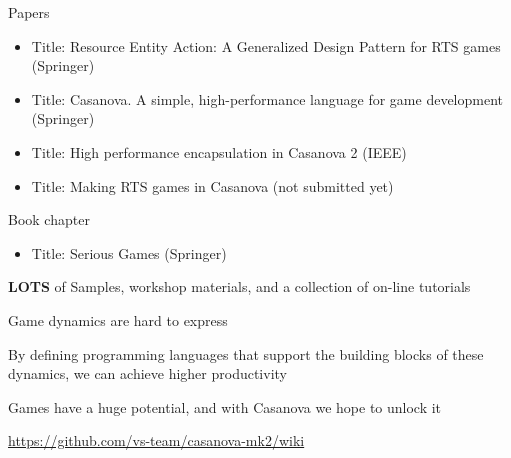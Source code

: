 \documentclass{beamer}
\begin{document}
\begin{slide}{
\item Papers
\begin{itemize}
\item Title: Resource Entity Action: A Generalized Design Pattern for RTS games (Springer)
\item Title: Casanova. A simple, high-performance language for game development (Springer)
\item Title: High performance encapsulation in Casanova 2 (IEEE)
\item Title: Making RTS games in Casanova (not submitted yet)
\end{itemize}
\item Book chapter
\begin{itemize}
	\item Title: Serious Games (Springer)
\end{itemize}
\item \textbf{LOTS} of Samples, workshop materials, and a collection of on-line tutorials
}\end{slide}

\begin{slide}{
\item Game dynamics are hard to express
\item By defining programming languages that support the building blocks of these dynamics, we can achieve higher productivity
\item Games have a huge potential, and with Casanova we hope to unlock it
\item[]
\item \url{https://github.com/vs-team/casanova-mk2/wiki}
}\end{slide}

\begin{thankyou}
\end{thankyou}
\end{document}
